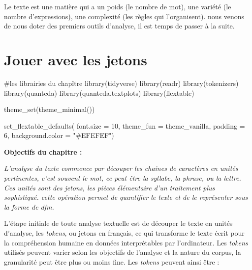 \documentclass[
  letterpaper,
  DIV=11,
  numbers=noendperiod]{scrreprt}
\newenvironment{Shaded}{\begin{snugshade}}{\end{snugshade}}
\newcommand{\AttributeTok}[1]{\textcolor[rgb]{0.40,0.45,0.13}{#1}}
\newcommand{\CommentTok}[1]{\textcolor[rgb]{0.37,0.37,0.37}{#1}}
\newcommand{\DecValTok}[1]{\textcolor[rgb]{0.68,0.00,0.00}{#1}}
\newcommand{\FunctionTok}[1]{\textcolor[rgb]{0.28,0.35,0.67}{#1}}
\newcommand{\NormalTok}[1]{\textcolor[rgb]{0.00,0.23,0.31}{#1}}
\newcommand{\StringTok}[1]{\textcolor[rgb]{0.13,0.47,0.30}{#1}}
\begin{document}
Le texte est une matière qui a un poids (le nombre de mot), une variété
(le nombre d'expressions), une complexité (les règles qui l'organisent).
nous venons de nous doter des premiers outils d'analyse, il est temps de
passer à la suite.


\chapter{Jouer avec les jetons}\label{jouer-avec-les-jetons}

\begin{Shaded}
\begin{Highlighting}[]
\CommentTok{\#les librairies du chapître}
\FunctionTok{library}\NormalTok{(tidyverse)}
\FunctionTok{library}\NormalTok{(readr)}
\FunctionTok{library}\NormalTok{(tokenizers)}
\FunctionTok{library}\NormalTok{(quanteda)}
\FunctionTok{library}\NormalTok{(quanteda.textplots)}
\FunctionTok{library}\NormalTok{(flextable)}

\FunctionTok{theme\_set}\NormalTok{(}\FunctionTok{theme\_minimal}\NormalTok{()) }

\FunctionTok{set\_flextable\_defaults}\NormalTok{(}
  \AttributeTok{font.size =} \DecValTok{10}\NormalTok{, }\AttributeTok{theme\_fun =}\NormalTok{ theme\_vanilla,}
  \AttributeTok{padding =} \DecValTok{6}\NormalTok{,}
  \AttributeTok{background.color =} \StringTok{"\#EFEFEF"}\NormalTok{)}
\end{Highlighting}
\end{Shaded}

\textbf{Objectifs du chapitre :}

\emph{L'analyse du texte commence par découper les chaines de caractères
en unités pertinentes, c'est souvent le mot, ce peut être la syllabe, la
phrase, ou la lettre. Ces unités sont des jetons, les pièces élémentaire
d'un traitement plus sophistiqué. cette opération permet de quantifier
le texte et de le représenter sous la forme de dfm.}

L'étape initiale de toute analyse textuelle est de découper le texte en
unités d'analyse, les \emph{tokens}, ou jetons en français, ce qui
transforme le texte écrit pour la compréhension humaine en données
interprétables par l'ordinateur. Les \emph{tokens} utilisés peuvent
varier selon les objectifs de l'analyse et la nature du corpus, la
granularité peut être plus ou moins fine. Les \emph{tokens} peuvent
ainsi être :
\end{document}
